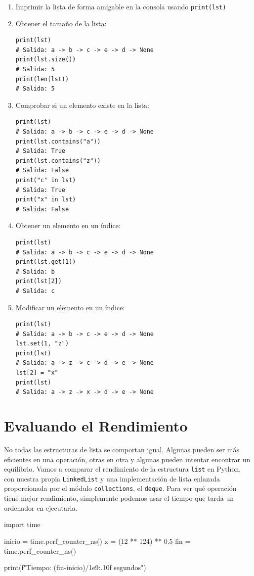 \documentclass[10pt,a4paper]{article}
\begin{document}
\begin{enumerate}
	\item Imprimir la lista de forma amigable en la consola usando \lstinline|print(lst)|
	\item Obtener el tamaño de la lista:
\begin{lstlisting}
print(lst)
# Salida: a -> b -> c -> e -> d -> None
print(lst.size())
# Salida: 5
print(len(lst))
# Salida: 5
\end{lstlisting}
	\item Comprobar si un elemento existe en la lista:
\begin{lstlisting}
print(lst)
# Salida: a -> b -> c -> e -> d -> None
print(lst.contains("a"))
# Salida: True
print(lst.contains("z"))
# Salida: False
print("c" in lst)
# Salida: True
print("x" in lst)
# Salida: False
\end{lstlisting}
	\item Obtener un elemento en un índice:
\begin{lstlisting}
print(lst)
# Salida: a -> b -> c -> e -> d -> None
print(lst.get(1))
# Salida: b
print(lst[2])
# Salida: c
\end{lstlisting}
	\item Modificar un elemento en un índice:
\begin{lstlisting}
print(lst)
# Salida: a -> b -> c -> e -> d -> None
lst.set(1, "z")
print(lst)
# Salida: a -> z -> c -> d -> e -> None
lst[2] = "x"
print(lst)
# Salida: a -> z -> x -> d -> e -> None
\end{lstlisting}
\end{enumerate}

\section*{Evaluando el Rendimiento}
No todas las estructuras de lista se comportan igual. Algunas pueden ser más eficientes en una operación, otras en otra y algunas pueden intentar encontrar un equilibrio. Vamos a comparar el rendimiento de la estructura \lstinline|list| en Python, con nuestra propia \lstinline|LinkedList| y una implementación de lista enlazada proporcionada por el módulo \lstinline|collections|, el \lstinline|deque|. Para ver qué operación tiene mejor rendimiento, simplemente podemos usar el tiempo que tarda un ordenador en ejecutarla.

\begin{attachedlisting}[time]
import time

inicio = time.perf_counter_ns()
x = (12 ** 124) ** 0.5
fin = time.perf_counter_ns()

print(f"Tiempo: {(fin-inicio)/1e9:.10f} segundos")
\end{attachedlisting}
\end{document}
